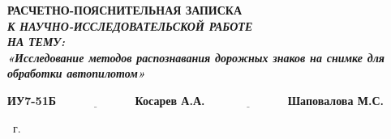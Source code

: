 \begin{titlepage}
	
	\begin{center}
		\Large\textbf{РАСЧЕТНО-ПОЯСНИТЕЛЬНАЯ ЗАПИСКА}\\
		\large\textit{\textbf{К НАУЧНО-ИССЛЕДОВАТЕЛЬСКОЙ РАБОТЕ}}\\
            \large\textbf{\textit{НА ТЕМУ:}}\\
            \textbf{\textit{«Исследование методов распознавания дорожных знаков на снимке для обработки автопилотом»}}
	\end{center}\vspace{2cm}

	
	\hspace{1cm}\textbf{ИУ7-51Б}\hfill$\underline{\text{~~~~~~~~~~~~~~~~~~~~~}}$\>\textbf{Косарев А.А.}\>\>\>\>\>\>\newline\newline
	\hspace{1cm}\hfill$\underline{\text{~~~~~~~~~~~~~~~~~~~~~}}$\>\textbf{Шаповалова М.С.}\newline\newline
	
	\begin{center}
		\vfill
		\the\year
		~г.
	\end{center}
\end{titlepage}

